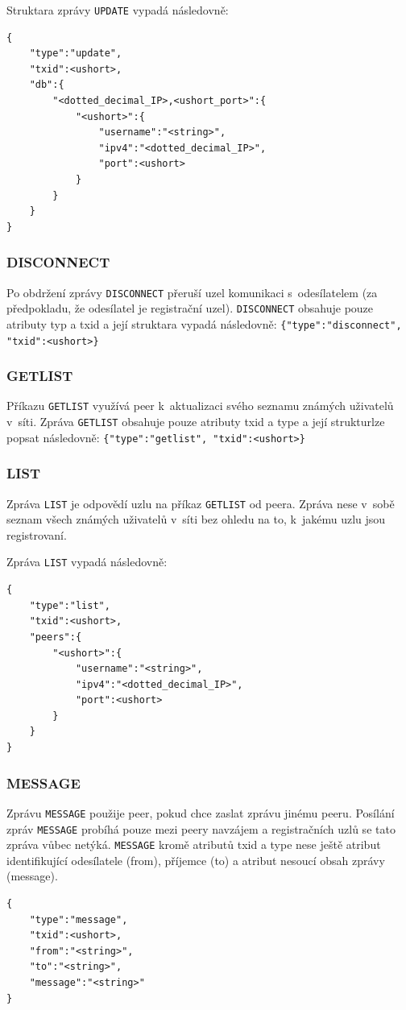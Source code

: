 \documentclass[11pt,a4paper,titlepage]{article}
\begin{document}
                Struktara zprávy \texttt{UPDATE} vypadá následovně:
\begin{verbatim}
{
    "type":"update",
    "txid":<ushort>,
    "db":{
        "<dotted_decimal_IP>,<ushort_port>":{
            "<ushort>":{
                "username":"<string>",
                "ipv4":"<dotted_decimal_IP>",
                "port":<ushort>
            }
        }
    }
}
\end{verbatim}

            \subsubsection{DISCONNECT}
                Po obdržení zprávy \texttt{DISCONNECT} přeruší uzel komunikaci s~odesílatelem (za předpokladu, že odesílatel je registrační uzel).
                \texttt{DISCONNECT} obsahuje pouze atributy typ a txid a její struktara vypadá následovně: \verb+{"type":"disconnect", "txid":<ushort>}+
            \subsubsection*{GETLIST}
                Příkazu \texttt{GETLIST} využívá peer k~aktualizaci svého seznamu známých uživatelů v~síti. Zpráva \texttt{GETLIST} obsahuje pouze
                atributy txid a type a její strukturlze popsat následovně: \verb+{"type":"getlist", "txid":<ushort>}+
            \subsubsection{LIST}
                Zpráva \texttt{LIST} je odpovědí uzlu na příkaz \texttt{GETLIST} od peera. Zpráva nese v~sobě seznam všech známých
                uživatelů v~síti bez ohledu na to, k~jakému uzlu jsou registrovaní.

                Zpráva \texttt{LIST} vypadá následovně:
\begin{verbatim}
{
    "type":"list",
    "txid":<ushort>,
    "peers":{
        "<ushort>":{
            "username":"<string>",
            "ipv4":"<dotted_decimal_IP>",
            "port":<ushort>
        }
    }
}
\end{verbatim}
            \subsubsection{MESSAGE}
                Zprávu \texttt{MESSAGE} použije peer, pokud chce zaslat zprávu jinému peeru. Posílání zpráv \texttt{MESSAGE}
                probíhá pouze mezi peery navzájem a registračních uzlů se tato zpráva vůbec netýká. \texttt{MESSAGE} kromě
                atributů txid a type nese ještě atribut identifikující odesílatele (from), příjemce (to) a atribut nesoucí obsah
                zprávy (message).
\begin{verbatim}
{
    "type":"message",
    "txid":<ushort>,
    "from":"<string>",
    "to":"<string>",
    "message":"<string>"
}
\end{verbatim}
\end{document}
